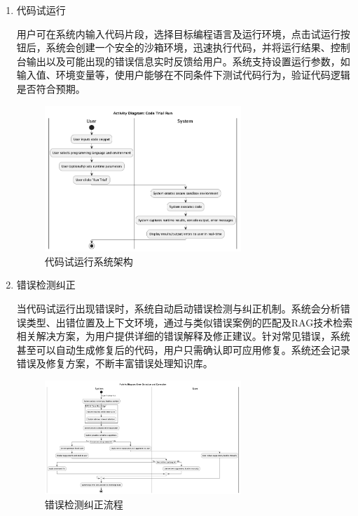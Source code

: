 \documentclass[
    report,     %
    oneside,    %
    UTF8,       %
    zihao=-4    %
]{config} %
\begin{document}
\begin{enumerate}[label=(\arabic*)]
    \item 代码试运行
    
    用户可在系统内输入代码片段，选择目标编程语言及运行环境，点击试运行按钮后，系统会创建一个安全的沙箱环境，迅速执行代码，并将运行结果、控制台输出以及可能出现的错误信息实时反馈给用户。系统支持设置运行参数，如输入值、环境变量等，使用户能够在不同条件下测试代码行为，验证代码逻辑是否符合预期。
    \begin{figure}[H]
        \centering
        \includegraphics[width=0.7\textwidth]{UML/Activity/Code-Trial-Run.png}
        \caption{代码试运行系统架构}
        \label{fig:CodeTrialRunSystem}
    \end{figure}
    
    \item 错误检测纠正
    
    当代码试运行出现错误时，系统自动启动错误检测与纠正机制。系统会分析错误类型、出错位置及上下文环境，通过与类似错误案例的匹配及RAG技术检索相关解决方案，为用户提供详细的错误解释及修正建议。针对常见错误，系统甚至可以自动生成修复后的代码，用户只需确认即可应用修复。系统还会记录错误及修复方案，不断丰富错误处理知识库。
    \begin{figure}[H]
        \centering
        \includegraphics[width=0.7\textwidth]{UML/Activity/Error-Detection-and-Correction.png}
        \caption{错误检测纠正流程}
        \label{fig:ErrorDetectionCorrection}
    \end{figure}
    

\end{enumerate}
\end{document}
